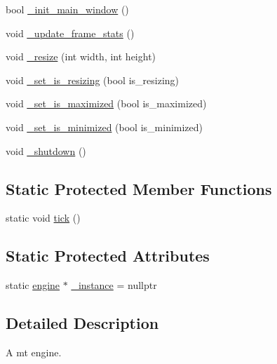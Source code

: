 \begin{DoxyCompactItemize}
\item 
bool \hyperlink{classengine_a958aa4120f21278468225415ffe5ac92_a958aa4120f21278468225415ffe5ac92}{\+\_\+init\+\_\+main\+\_\+window} ()
\item 
void \hyperlink{classengine_aef40b48edcc51792bb523f80c4eebbd3_aef40b48edcc51792bb523f80c4eebbd3}{\+\_\+update\+\_\+frame\+\_\+stats} ()
\item 
void \hyperlink{classengine_a097517979864142f35d1969b5cf3d437_a097517979864142f35d1969b5cf3d437}{\+\_\+resize} (int width, int height)
\item 
void \hyperlink{classengine_aaf4ce7238cb93e84238be506d454e2e2_aaf4ce7238cb93e84238be506d454e2e2}{\+\_\+set\+\_\+is\+\_\+resizing} (bool is\+\_\+resizing)
\item 
void \hyperlink{classengine_a7a11837ff93305b2401dc9556bb4fb46_a7a11837ff93305b2401dc9556bb4fb46}{\+\_\+set\+\_\+is\+\_\+maximized} (bool is\+\_\+maximized)
\item 
void \hyperlink{classengine_a2d4770d27419ae2da2c4cd1b1d4bdfae_a2d4770d27419ae2da2c4cd1b1d4bdfae}{\+\_\+set\+\_\+is\+\_\+minimized} (bool is\+\_\+minimized)
\item 
void \hyperlink{classengine_acd777bc3c114987c48721b4aa96a477b_acd777bc3c114987c48721b4aa96a477b}{\+\_\+shutdown} ()
\end{DoxyCompactItemize}
\subsection*{Static Protected Member Functions}
\begin{DoxyCompactItemize}
\item 
static void \hyperlink{classengine_a4bca5e9257e46c09a63f71227fc25a12_a4bca5e9257e46c09a63f71227fc25a12}{tick} ()
\end{DoxyCompactItemize}
\subsection*{Static Protected Attributes}
\begin{DoxyCompactItemize}
\item 
static \hyperlink{classengine}{engine} $\ast$ \hyperlink{classengine_a00e450887bc9ea7dd0a033f3347dfbe7_a00e450887bc9ea7dd0a033f3347dfbe7}{\+\_\+instance} = nullptr
\end{DoxyCompactItemize}


\subsection{Detailed Description}
A mt engine. 

